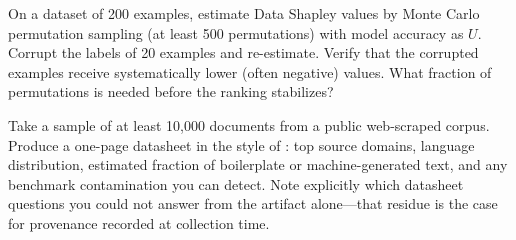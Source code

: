 \begin{Exercise}
On a dataset of 200 examples, estimate Data Shapley values by Monte Carlo permutation sampling (at least 500 permutations) with model accuracy as $U$. Corrupt the labels of 20 examples and re-estimate. Verify that the corrupted examples receive systematically lower (often negative) values. What fraction of permutations is needed before the ranking stabilizes?
\end{Exercise}

\begin{Exercise}
Take a sample of at least 10{,}000 documents from a public web-scraped corpus. Produce a one-page datasheet in the style of \textcite{gebru2021datasheets}: top source domains, language distribution, estimated fraction of boilerplate or machine-generated text, and any benchmark contamination you can detect. Note explicitly which datasheet questions you could not answer from the artifact alone---that residue is the case for provenance recorded at collection time.
\end{Exercise}
\apxnumoff
